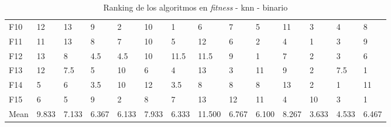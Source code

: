 \begin{table}
\begin{adjustbox}{width=\linewidth}
\begin{tabular}{llllllllllllll}
            F10  & 12    & 13    & 9     & 2     & 10    & 1     & 6      & 7     & 5     & 11    & 3     & 4     & 8     \\
            F11  & 11    & 13    & 8     & 7     & 10    & 5     & 12     & 6     & 2     & 4     & 1     & 3     & 9     \\
            F12  & 13    & 8     & 4.5   & 4.5   & 10    & 11.5  & 11.5   & 9     & 1     & 7     & 2     & 3     & 6     \\
            F13  & 12    & 7.5   & 5     & 10    & 6     & 4     & 13     & 3     & 11    & 9     & 2     & 7.5   & 1     \\
            F14  & 5     & 6     & 3.5   & 10    & 12    & 3.5   & 8      & 8     & 8     & 13    & 2     & 1     & 11    \\
            F15  & 6     & 5     & 9     & 2     & 8     & 7     & 13     & 12    & 11    & 4     & 10    & 3     & 1     \\
            Mean & 9.833 & 7.133 & 6.367 & 6.133 & 7.933 & 6.333 & 11.500 & 6.767 & 6.100 & 8.267 & 3.633 & 4.533 & 6.467 \\
            \bottomrule
        \end{tabular}
    \end{adjustbox}
    \caption{Ranking de los algoritmos en \textit{fitness} - knn - binario}
    \label{tab:ranking_fitness_bin_knn}
\end{table}

